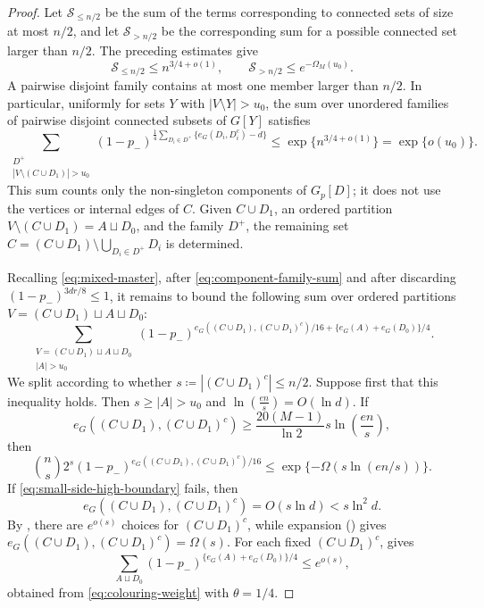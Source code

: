 \documentclass[notitlepage]{scrartcl}
\begin{document}
\begin{proof}
Let $\mathcal{S}_{\le n/2}$ be the sum of the terms corresponding to connected sets of size at most $n/2$, and let $\mathcal{S}_{>n/2}$ be the corresponding sum for a possible connected set larger than $n/2$.
The preceding estimates give
\[
 \mathcal{S}_{\le n/2}\le n^{3/4+o(1)},
 \qquad
 \mathcal{S}_{>n/2}\le e^{-\Omega_M(u_0)}.
\]
A pairwise disjoint family contains at most one member larger than $n/2$.
In particular, uniformly for sets $Y$ with $|V\setminus Y|>u_0$, the sum over unordered families of pairwise disjoint connected subsets of $G[Y]$ satisfies
\begin{equation}\label{eq:component-family-sum}
 \sum_{\substack{D^+\\|V\setminus (C \cup D_1)|>u_0}}
 (1-p_-)^{\frac14\sum_{D_i\in D^+}\{e_G(D_i, D_i^c)-d\}}
 \le\exp\{n^{3/4+o(1)}\}
 =\exp\{o(u_0)\}.
\end{equation}
This sum counts only the non-singleton components of $G_p[D]$; it does not use the vertices or internal edges of $C$. Given $C \cup D_1$, an ordered partition $V\setminus (C \cup D_1)=A\sqcup D_0$, and the family $D^+$, the remaining set
$C=(C \cup D_1)\setminus\bigcup_{D_i\in D^+}D_i$ is determined.

Recalling \eqref{eq:mixed-master}, after \eqref{eq:component-family-sum} and after discarding $(1-p_-)^{3dr/8}\le1$, it remains to bound the following sum over ordered partitions $V=(C \cup D_1)\sqcup A\sqcup D_0$:
\begin{equation}\label{eq:ordered-partition-sum}
  \sum_{\substack{V=(C \cup D_1)\sqcup A\sqcup D_0\\
 |A|>u_0}}  (1-p_-)^{e_G((C \cup D_1), (C \cup D_1)^c)/16+\{e_G(A)+e_G(D_0)\}/4}.  
\end{equation}
We split according to whether $s \coloneqq |(C \cup D_1)^c|\le n/2$. Suppose first that this inequality holds. Then $s\ge |A|>u_0$ and $\ln\left(\frac{en}{s}\right)=O(\ln d)$.
If
\begin{equation}\label{eq:small-side-high-boundary}
 e_G((C \cup D_1), (C \cup D_1)^c) \ge \frac{20(M-1)}{\ln 2}s\ln\left(\frac{en}{s}\right),
\end{equation}
then
\[
 \binom ns2^s (1-p_-)^{e_G((C \cup D_1), (C \cup D_1)^c)/16}
 \le \exp\{-\Omega(s\ln(en/s))\}.
\]
If \eqref{eq:small-side-high-boundary} fails, then
\[
 e_G((C \cup D_1), (C \cup D_1)^c)=O(s\ln d)<s\ln^2 d.
\]
By , there are $e^{o(s)}$ choices for $(C \cup D_1)^c$, while expansion () gives $e_G((C \cup D_1), (C \cup D_1)^c)= \Omega(s)$.
For each fixed $(C \cup D_1)^c$,  gives
\[
 \sum_{A\sqcup D_0}  (1-p_-)^{\{e_G(A)+e_G(D_0)\}/4}\le e^{o(s)},
\]
obtained from \eqref{eq:colouring-weight} with $\theta=1/4$.


\end{proof}
\end{document}
